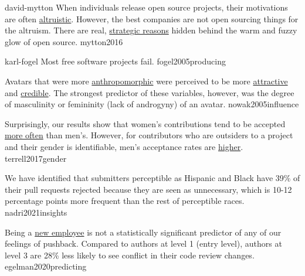 \documentclass{article}
\begin{document}


\qte
  {david-mytton}
  {When individuals release open source projects, their motivations are often \ul{altruistic}. However, the best companies are not open sourcing things for the altruism. There are real, \ul{strategic reasons} hidden behind the warm and fuzzy glow of open source.}
  {mytton2016}

\qte
  {karl-fogel}
  {Most free software projects fail.}
  {fogel2005producing}




  {Avatars that were more \ul{anthropomorphic} were perceived to be more \ul{attractive} and \ul{credible}. The strongest predictor of these variables, however, was the degree of masculinity or femininity (lack of androgyny) of an avatar.}
  {nowak2005influence}

  {Surprisingly, our results show that women's contributions tend to be accepted \ul{more often} than men’s. However, for contributors who are outsiders to a project and their gender is identifiable, men's acceptance rates are \ul{higher}.}
  {terrell2017gender}

  {We have identified that submitters perceptible as Hispanic and Black have 39\% of their pull requests rejected because they are seen as unnecessary, which is 10-12 percentage points more frequent than the rest of perceptible races.}
  {nadri2021insights}

  {Being a \ul{new employee} is not a statistically significant predictor of any of our feelings of pushback. Compared to authors at level 1 (entry level), authors at level 3 are 28\% less likely to see conflict in their code review changes.}
  {egelman2020predicting}


\end{document}
